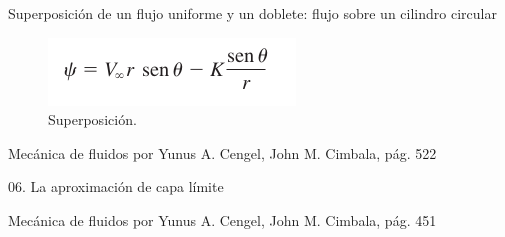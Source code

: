 
\begin{frame}{Superposición de un flujo uniforme y un doblete: flujo sobre un cilindro circular}
\justifying
\begin{figure}[H]
\centering
\includegraphics[scale=0.35]{Section_Files/S3-imagenes-Jhon/0137.png}
\caption{Superposición.}
\end{figure}
{\tiny Mecánica de fluidos por Yunus A. Cengel, John M. Cimbala, pág. 522}
\end{frame}


\begin{frame}{06. La aproximación de capa límite}
\justifying

\begin{figure}
\centering
{}

\end{figure}

{\tiny Mecánica de fluidos por Yunus A. Cengel, John M. Cimbala, pág. 451}
\end{frame}

